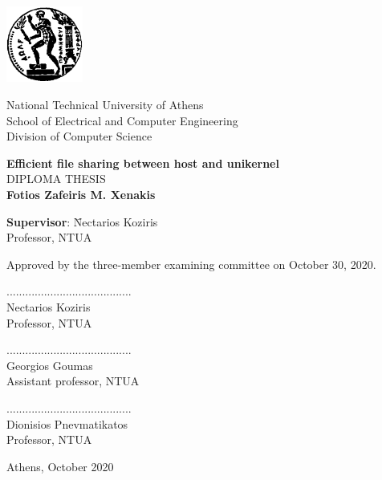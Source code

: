 \documentclass[12pt, a4paper, notitlepage]{report}
\newcommand{\blankpage}{\newpage\null\thispagestyle{empty}\newpage}
\begin{document}
\blankpage

\vspace*{-8ex}
\noindent
\begin{minipage}{3.0cm}
	\includegraphics[height=2.5cm]{pyrforos}
\end{minipage}
\begin{minipage}{12.0cm}
	National Technical University of Athens \\[3pt]
	School of Electrical and Computer Engineering \\[3pt]
	Division of Computer Science
\end{minipage}
\vspace{14ex}
\begin{center}
	\large\textbf{Efficient file sharing between host and unikernel} \\
	\vspace{14ex}
	\large{DIPLOMA THESIS} \\
	\vspace{1ex}
	\center\textbf{Fotios Zafeiris M. Xenakis}
\end{center}
\vfill
\begin{tabbing}
	\normalsize
	\textbf{Supervisor}: \= Nectarios Koziris \\
						 \> Professor, NTUA
\end{tabbing}
\vspace{4ex}
Approved by the three-member examining committee on October 30, 2020.
\vspace{4ex}
\begin{center}
	\scriptsize
	\parbox[b]{0.3\textwidth} {
		\center
		........................................ \\
		Nectarios Koziris \\
		Professor, NTUA
	}
	\parbox[b]{0.3\textwidth} {
		\center
		........................................ \\
		Georgios Goumas \\
		Assistant professor, NTUA
	}
	\parbox[b]{0.3\textwidth} {
		\center
		........................................ \\
		Dionisios Pnevmatikatos \\
		Professor, NTUA
	}
\end{center}
\vspace{2ex}
\begin{center}
	\normalsize
	Athens, October 2020
\end{center}
\thispagestyle{empty}
\end{document}
